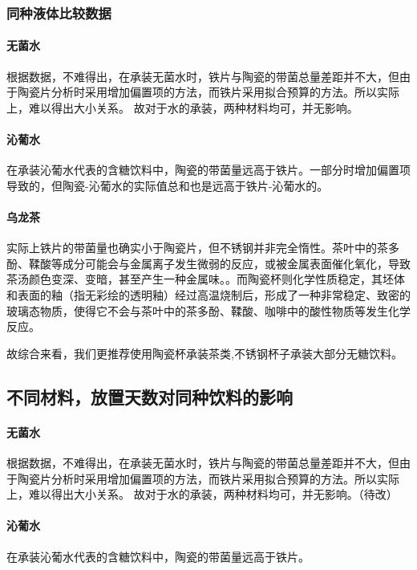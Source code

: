 \documentclass[12pt,a4paper]{ctexart}
\begin{document}
\subsubsection{同种液体比较数据}
\paragraph{无菌水}

根据数据，不难得出，在承装无菌水时，铁片与陶瓷的带菌总量差距并不大，但由于陶瓷片分析时采用增加偏置项的方法，而铁片采用拟合预算的方法。所以实际上，难以得出大小关系。
故对于水的承装，两种材料均可，并无影响。


\paragraph{沁葡水}
在承装沁葡水代表的含糖饮料中，陶瓷的带菌量远高于铁片。\cite{1013165979.nh}\cite{GNCL200603020}\cite{GYYX199305057}一部分时增加偏置项导致的，但陶瓷-沁葡水的实际值总和也是远高于铁片-沁葡水的。\cite{XFZB20041203A032}

\paragraph{乌龙茶}
实际上铁片的带菌量也确实小于陶瓷片\cite{JSHJ201504002}，但不锈钢并非完全惰性。茶叶中的茶多酚、\cite{HXSJ202002001}鞣酸等成分可能会与金属离子发生微弱的反应，或被金属表面催化氧化，导致茶汤颜色变深、变暗，甚至产生一种金属味。\cite{JSHJ201504002}。而陶瓷杯则化学性质稳定，其坯体和表面的釉（指无彩绘的透明釉）经过高温烧制后，形成了一种非常稳定、致密的玻璃态物质，使得它不会与茶叶中的茶多酚、鞣酸、咖啡中的酸性物质等发生化学反应。 

故综合来看，我们更推荐使用陶瓷杯承装茶类,\cite{2002051717.nh}不锈钢杯子承装大部分无糖饮料。

\subsection{不同材料，放置天数对同种饮料的影响}
\paragraph{无菌水}

根据数据，不难得出，在承装无菌水时，铁片与陶瓷的带菌总量差距并不大，但由于陶瓷片分析时采用增加偏置项的方法，而铁片采用拟合预算的方法。所以实际上，难以得出大小关系。
故对于水的承装，两种材料均可，并无影响。（待改）


\paragraph{沁葡水}
在承装沁葡水代表的含糖饮料中，陶瓷的带菌量远高于铁片。
\end{document}
